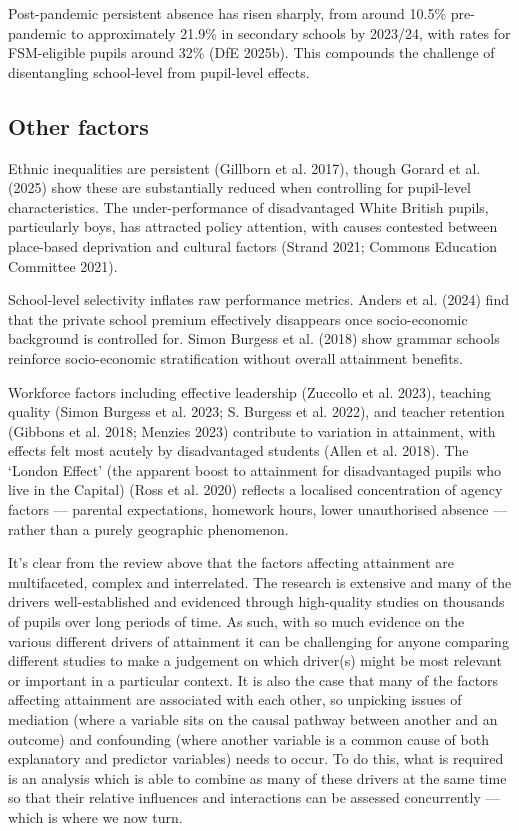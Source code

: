 \documentclass[
  12pt,
  titlepage]{article}
\begin{document}
Post-pandemic persistent absence has risen sharply, from around 10.5\%
pre-pandemic to approximately 21.9\% in secondary schools by 2023/24,
with rates for FSM-eligible pupils around 32\% (DfE 2025b). This
compounds the challenge of disentangling school-level from pupil-level
effects.

\subsection{Other factors}\label{other-factors}

Ethnic inequalities are persistent (Gillborn et al. 2017), though Gorard
et al. (2025) show these are substantially reduced when controlling for
pupil-level characteristics. The under-performance of disadvantaged
White British pupils, particularly boys, has attracted policy attention,
with causes contested between place-based deprivation and cultural
factors (Strand 2021; Commons Education Committee 2021).

School-level selectivity inflates raw performance metrics. Anders et al.
(2024) find that the private school premium effectively disappears once
socio-economic background is controlled for. Simon Burgess et al. (2018)
show grammar schools reinforce socio-economic stratification without
overall attainment benefits.

Workforce factors including effective leadership (Zuccollo et al. 2023),
teaching quality (Simon Burgess et al. 2023; S. Burgess et al. 2022),
and teacher retention (Gibbons et al. 2018; Menzies 2023) contribute to
variation in attainment, with effects felt most acutely by disadvantaged
students (Allen et al. 2018). The `London Effect' (the apparent boost to
attainment for disadvantaged pupils who live in the Capital) (Ross et
al. 2020) reflects a localised concentration of agency factors ---
parental expectations, homework hours, lower unauthorised absence ---
rather than a purely geographic phenomenon.

It's clear from the review above that the factors affecting attainment
are multifaceted, complex and interrelated. The research is extensive
and many of the drivers well-established and evidenced through
high-quality studies on thousands of pupils over long periods of time.
As such, with so much evidence on the various different drivers of
attainment it can be challenging for anyone comparing different studies
to make a judgement on which driver(s) might be most relevant or
important in a particular context. It is also the case that many of the
factors affecting attainment are associated with each other, so
unpicking issues of mediation (where a variable sits on the causal
pathway between another and an outcome) and confounding (where another
variable is a common cause of both explanatory and predictor variables)
needs to occur. To do this, what is required is an analysis which is
able to combine as many of these drivers at the same time so that their
relative influences and interactions can be assessed concurrently ---
which is where we now turn.
\end{document}
